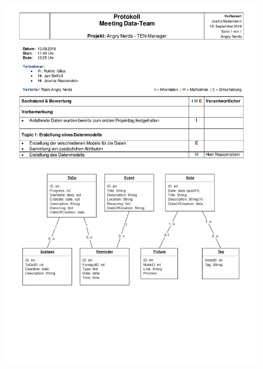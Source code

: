 \begin{figure}[H]
\centering
\begin{minipage}[t]{1\textwidth} %
\includegraphics[width=1\textwidth]{img/Protokoll-DataTeam2018-09-15.pdf}\\ %
\end{minipage}
\end{figure}

